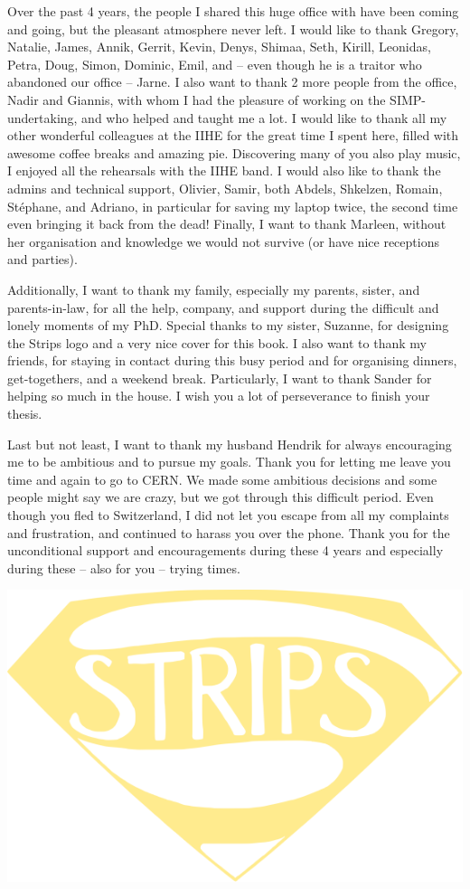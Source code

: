 Over the past 4 years, the people I shared this huge office with have been coming and going, but the pleasant atmosphere never left. I would like to thank Gregory, Natalie, James, Annik, Gerrit, Kevin, Denys, Shimaa, Seth, Kirill, Leonidas, Petra, Doug, Simon, Dominic, Emil, and -- even though he is a traitor who abandoned our office -- Jarne. I also want to thank 2 more people from the office, Nadir and Giannis, with whom I had the pleasure of working on the SIMP-undertaking, and who helped and taught me a lot. I would like to thank all my other wonderful colleagues at the IIHE for the great time I spent here, filled with awesome coffee breaks and amazing pie. Discovering many of you also play music, I enjoyed all the rehearsals with the IIHE band. I would also like to thank the admins and technical support, Olivier, Samir, both Abdels, Shkelzen, Romain, St\'ephane, and Adriano, in particular for saving my laptop twice, the second time even bringing it back from the dead! Finally, I want to thank Marleen, without her organisation and knowledge we would not survive (or have nice receptions and parties).

Additionally, I want to thank my family, especially my parents, sister, and parents-in-law, for all the help, company, and support during the difficult and lonely moments of my PhD. Special thanks to my sister, Suzanne, for designing the Strips logo and a very nice cover for this book. I also want to thank my friends, for staying in contact during this busy period and for organising dinners, get-togethers, and a weekend break. Particularly, I want to thank Sander for helping so much in the house. I wish you a lot of perseverance to finish your thesis.

Last but not least, I want to thank my husband Hendrik for always encouraging me to be ambitious and to pursue my goals. Thank you for letting me leave you time and again to go to CERN. We made some ambitious decisions and some people might say we are crazy, but we got through this difficult period. Even though you fled to Switzerland, I did not let you escape from all my complaints and frustration, and continued to harass you over the phone. Thank you for the unconditional support and encouragements during these 4 years and especially during these -- also for you -- trying times.

\vspace{4cm}

\begin{center}
 \includegraphics[width=.8\textwidth]{stripslogo}
\end{center}

